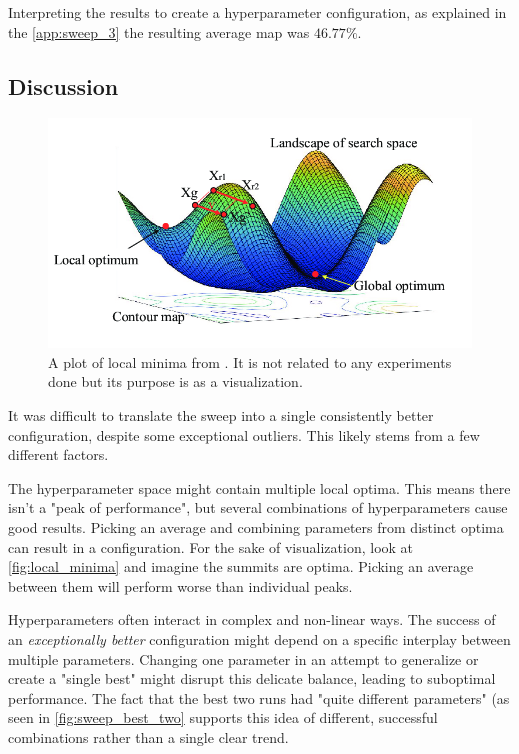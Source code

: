 Interpreting the results to create a hyperparameter configuration, as explained in the \autoref{app:sweep_3} the resulting average \acrshort{map} was \(46.77\%\). 

\subsection{Discussion}
\label{ssec:ex4_discussion}


\begin{figure}
    \centering
    \includegraphics[width=0.75\linewidth]{figures/local_minima.png}
    \caption{A plot of local minima from \cite{fig:multiple_local_minima}. It is not related to any experiments done but its purpose is as a visualization.}
    \label{fig:local_minima}
\end{figure}

It was difficult to translate the sweep into a single consistently better configuration, despite some exceptional outliers. This likely stems from a few different factors. 

The hyperparameter space might contain multiple local optima. This means there isn't a "peak of performance", but several combinations of hyperparameters cause good results. Picking an average and combining parameters from distinct optima can result in a configuration. For the sake of visualization, look at \autoref{fig:local_minima} and imagine the summits are optima. Picking an average between them will perform worse than individual peaks. 

Hyperparameters often interact in complex and non-linear ways. The success of an \emph{exceptionally better} configuration might depend on a specific interplay between multiple parameters. Changing one parameter in an attempt to generalize or create a "single best" might disrupt this delicate balance, leading to suboptimal performance. The fact that the best two runs had "quite different parameters" (as seen in \autoref{fig:sweep_best_two} supports this idea of different, successful combinations rather than a single clear trend.


